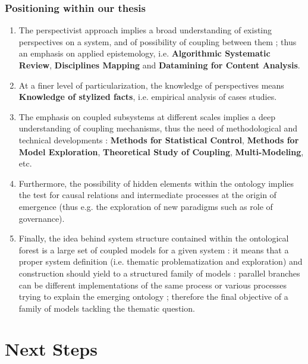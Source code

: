 \begin{frame}[allowframebreaks]

\frametitle{Positioning within our thesis}

\begin{justify}

\begin{enumerate}
\item The perspectivist approach implies a broad understanding of existing perspectives on a system, and of possibility of coupling between them ; thus an emphasis on applied epistemology, i.e. \textbf{Algorithmic Systematic Review}, \textbf{Disciplines Mapping} and \textbf{Datamining for Content Analysis}.\medskip
\item At a finer level of particularization, the knowledge of perspectives means \textbf{Knowledge of stylized facts}, i.e. empirical analysis of cases studies.\medskip
\item The emphasis on coupled subsystems at different scales implies a deep understanding of coupling mechanisms, thus the need of methodological and technical developments : \textbf{Methods for Statistical Control}, \textbf{Methods for Model Exploration}, \textbf{Theoretical Study of Coupling}, \textbf{Multi-Modeling}, etc.\medskip
\item Furthermore, the possibility of hidden elements within the ontology implies the test for causal relations and intermediate processes at the origin of emergence (thus e.g. the exploration of new paradigms such as role of governance).\medskip
\item Finally, the idea behind system structure contained within the ontological forest is a large set of coupled models for a given system : it means that a proper system definition (i.e. thematic problematization and exploration) and construction should yield to a structured family of models : parallel branches can be different implementations of the same process or various processes trying to explain the emerging ontology ; therefore the final objective of a family of models tackling the thematic question.
\end{enumerate}

\end{justify}

\end{frame}


\section{Next Steps}

